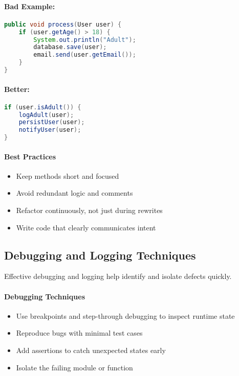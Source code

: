 \documentclass[a4paper,12pt]{article}
\begin{document}
\paragraph{Bad Example:}
\begin{lstlisting}[language=Java]
public void process(User user) {
    if (user.getAge() > 18) {
        System.out.println("Adult");
        database.save(user);
        email.send(user.getEmail());
    }
}
\end{lstlisting}

\paragraph{Better:}
\begin{lstlisting}[language=Java]
if (user.isAdult()) {
    logAdult(user);
    persistUser(user);
    notifyUser(user);
}
\end{lstlisting}

\paragraph{Best Practices}
\begin{itemize}
  \item Keep methods short and focused
  \item Avoid redundant logic and comments
  \item Refactor continuously, not just during rewrites
  \item Write code that clearly communicates intent
\end{itemize}

\subsection{Debugging and Logging Techniques}

Effective debugging and logging help identify and isolate defects quickly.

\paragraph{Debugging Techniques}

\begin{itemize}
  \item Use breakpoints and step-through debugging to inspect runtime state
  \item Reproduce bugs with minimal test cases
  \item Add assertions to catch unexpected states early
  \item Isolate the failing module or function
\end{itemize}
\end{document}

